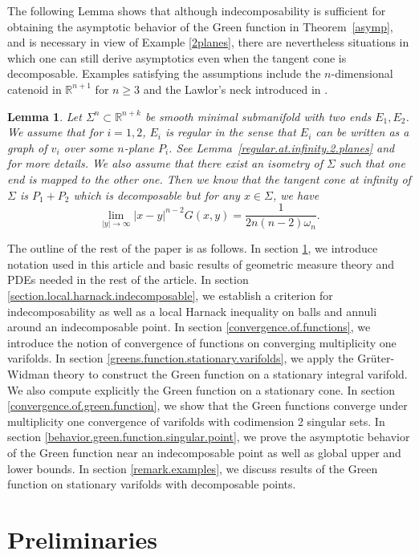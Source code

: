 \documentclass[11pt]{amsart}
\newtheorem{lemma}[theorem]{Lemma}
\theoremstyle{definition}
\newcommand{\R}{\mathbb{R}}
\begin{document}
The following Lemma shows that although indecomposability is sufficient for obtaining the asymptotic behavior of the Green function in Theorem~\ref{asymp}, and is necessary in view of Example \ref{2planes}, there are nevertheless situations in which one can still derive asymptotics even when the tangent cone is decomposable. Examples satisfying the assumptions include the $n$-dimensional catenoid in $\R^{n+1}$ for $n\ge 3$ and the Lawlor's neck introduced in \cite{La}. 
\begin{lemma}
    Let $\Sigma^n\subset \R^{n+k}$ be smooth minimal submanifold with two ends $E_1,E_2$. We assume that for $i=1,2$, $E_i$ is regular in the sense that $E_i$ can be written as a graph of $v_i$ over some $n$-plane $P_i$. See Lemma~\ref{regular.at.infinity.2.planes} and \cite[Definition, page 800]{Sch83} for more details. We also assume that there exist an isometry of $\Sigma$  such that one end is mapped to the other one. Then we know that the tangent cone at infinity of $\Sigma$  is $P_1+ P_2$ which is decomposable but for any  $x\in\Sigma $, we have\[\lim_{|y|\to\infty}|x-y|^{n-2}G(x,y)=\frac{1}{2n(n-2)\omega_n}.\] 
\end{lemma}
The outline of the rest of the paper is as follows. In section \ref{preliminaries}, we introduce notation used in this article and basic results of geometric measure theory and PDEs needed in the rest of the article. In section \ref{section.local.harnack.indecomposable}, we establish a criterion for indecomposability as well as a local Harnack inequality on balls and annuli around an indecomposable point. In section \ref{convergence.of.functions}, we introduce the notion of convergence of functions on converging multiplicity one varifolds. In section \ref{greens.function.stationary.varifolds}, we apply the Gr\"uter-Widman theory to construct the Green function on a stationary integral varifold. We also compute explicitly the Green function on a stationary cone.   In section \ref{convergence.of.green.function}, we show that the Green functions converge under multiplicity one convergence of varifolds with codimension 2 singular sets. In section \ref{behavior.green.function.singular.point}, we prove the asymptotic behavior of the Green function near an indecomposable point as well as global upper and lower bounds. In section \ref{remark.examples}, we discuss results of the Green function on stationary varifolds with decomposable points.
\section{Preliminaries}\label{preliminaries}
\end{document}

